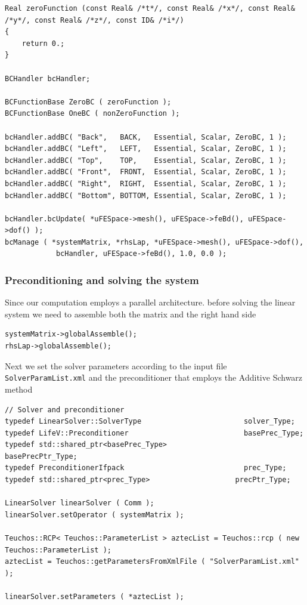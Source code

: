 \begin{itemize}
\begin{lstlisting}
Real zeroFunction (const Real& /*t*/, const Real& /*x*/, const Real& /*y*/, const Real& /*z*/, const ID& /*i*/)
{
    return 0.;
}

BCHandler bcHandler;

BCFunctionBase ZeroBC ( zeroFunction );
BCFunctionBase OneBC ( nonZeroFunction );

bcHandler.addBC( "Back",   BACK,   Essential, Scalar, ZeroBC, 1 );
bcHandler.addBC( "Left",   LEFT,   Essential, Scalar, ZeroBC, 1 );
bcHandler.addBC( "Top",    TOP,    Essential, Scalar, ZeroBC, 1 );
bcHandler.addBC( "Front",  FRONT,  Essential, Scalar, ZeroBC, 1 );
bcHandler.addBC( "Right",  RIGHT,  Essential, Scalar, ZeroBC, 1 );
bcHandler.addBC( "Bottom", BOTTOM, Essential, Scalar, ZeroBC, 1 );

bcHandler.bcUpdate( *uFESpace->mesh(), uFESpace->feBd(), uFESpace->dof() );
bcManage ( *systemMatrix, *rhsLap, *uFESpace->mesh(), uFESpace->dof(), 
            bcHandler, uFESpace->feBd(), 1.0, 0.0 );
\end{lstlisting}

\subsubsection*{Preconditioning and solving the system}
Since our computation employs a parallel architecture. before solving the linear system we need to assemble both the matrix and the right hand side
\begin{lstlisting}
systemMatrix->globalAssemble();
rhsLap->globalAssemble();
\end{lstlisting}
Next we set the solver parameters according to the input file \verb!SolverParamList.xml! and the preconditioner that employs the Additive Schwarz method
\begin{lstlisting}
// Solver and preconditioner
typedef LinearSolver::SolverType                        solver_Type;
typedef LifeV::Preconditioner                           basePrec_Type;
typedef std::shared_ptr<basePrec_Type>                basePrecPtr_Type;
typedef PreconditionerIfpack                            prec_Type;
typedef std::shared_ptr<prec_Type>                    precPtr_Type;

LinearSolver linearSolver ( Comm );
linearSolver.setOperator ( systemMatrix );

Teuchos::RCP< Teuchos::ParameterList > aztecList = Teuchos::rcp ( new Teuchos::ParameterList );
aztecList = Teuchos::getParametersFromXmlFile ( "SolverParamList.xml" );

linearSolver.setParameters ( *aztecList );


\end{lstlisting}
\end{itemize}

